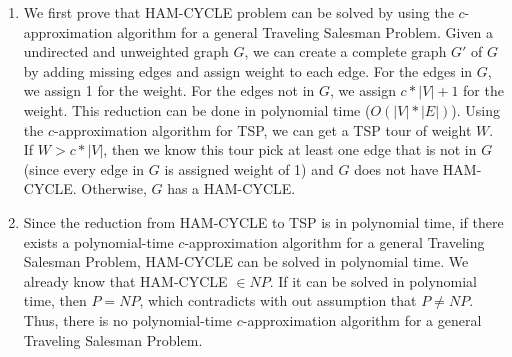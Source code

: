 \documentclass{article}%
\begin{document}
\begin{enumerate}
\begin{enumerate}
\begin{enumerate}
	\item We first prove that HAM-CYCLE problem can be solved by using the $c$-approximation algorithm for a general Traveling Salesman Problem. Given a undirected and unweighted graph $G$, we can create a complete graph $G'$ of $G$ by adding missing edges and assign weight to each edge. For the edges in $G$, we assign 1 for the weight. For the edges not in $G$, we assign $c*|V| + 1$ for the weight. This reduction can be done in polynomial time ($O(|V|*|E|)$). Using the $c$-approximation algorithm for TSP, we can get a TSP tour of weight $W$. If $W > c*|V|$, then we know this tour pick at least one edge that is not in $G$ (since every edge in $G$ is assigned weight of 1) and $G$ does not have HAM-CYCLE. Otherwise, $G$ has a HAM-CYCLE.
  \item Since the reduction from HAM-CYCLE to TSP is in polynomial time, if there exists a polynomial-time $c$-approximation algorithm for a general Traveling Salesman Problem, HAM-CYCLE can be solved in polynomial time. We already know that HAM-CYCLE $\in NP$. If it can be solved in polynomial time, then $P=NP$, which contradicts with out assumption that $P \neq NP$. Thus, there is no polynomial-time $c$-approximation algorithm for a general Traveling Salesman Problem. 
\end{enumerate}
	
	
	
	
	
\end{enumerate}
		\end{enumerate}
\end{document}
